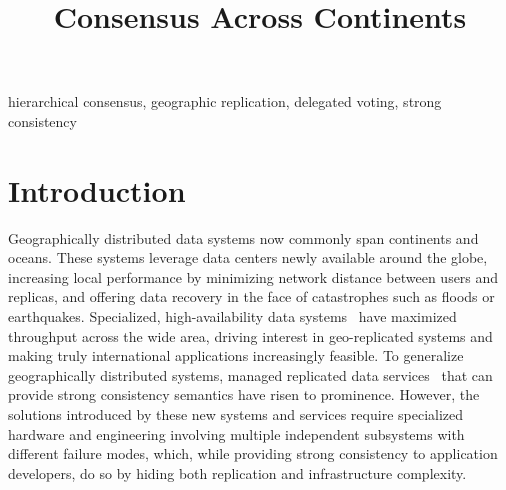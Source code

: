 \documentclass[11pt,conference]{IEEEtran}
\begin{document}
\title{Consensus Across Continents}

\author{
}

\maketitle

\begin{abstract}
    
\end{abstract}

\begin{IEEEkeywords}
hierarchical consensus, geographic replication, delegated voting, strong consistency
\end{IEEEkeywords}

\section{Introduction}

Geographically distributed data systems now commonly
span continents and oceans.
These
systems leverage data centers newly available around the globe,
increasing local performance by minimizing network distance between users and
replicas, and offering data recovery in the face of catastrophes such as floods or
earthquakes.
Specialized, high-availability data systems~\cite{megastore,tao,akkio,dynamic_placement}
have maximized throughput across the wide area, driving interest in
geo-replicated systems and making truly international applications increasingly
feasible.
To generalize geographically distributed systems, managed replicated data
services~\cite{spanner,aurora,cockroachdb} that can provide strong consistency semantics
have risen to prominence.
However, the solutions introduced by these new systems and services require specialized
hardware and engineering involving multiple independent subsystems with different
failure modes, which, while providing strong consistency to application developers, do
so by hiding both replication and infrastructure complexity.
\end{document}
